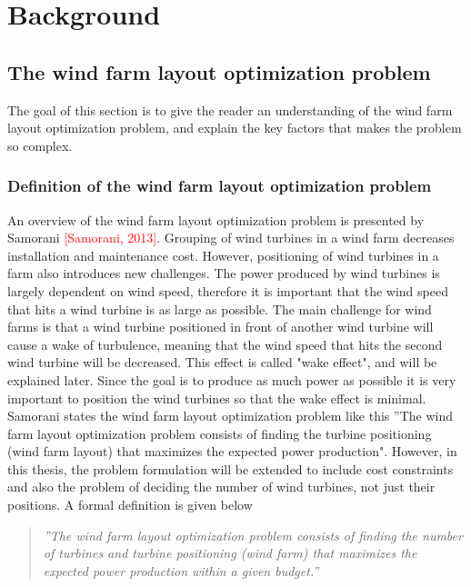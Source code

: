 \chapter{Background}


\section{The wind farm layout optimization problem}
The goal of this section is to give the reader an understanding of the wind farm layout optimization problem, and explain the key factors that makes the problem so complex. \textcolor{red}{\citep{Test}}


\subsection{Definition of the wind farm layout optimization problem}
An overview of the wind farm layout optimization problem is presented by Samorani \textcolor{red}{[Samorani, 2013]}. Grouping of wind turbines in a wind farm decreases installation and maintenance cost. However, positioning of wind turbines in a farm also introduces new challenges. The power produced by wind turbines is largely dependent on wind speed, therefore it is important that the wind speed that hits a wind turbine is as large as possible. The main challenge for wind farms is that a wind turbine positioned in front of another wind turbine will cause a wake of turbulence, meaning that the wind speed that hits the second wind turbine will be decreased. This effect is called "wake effect", and will be explained later. Since the goal is to produce as much power as possible it is very important to position the wind turbines so that the wake effect is minimal. Samorani states the wind farm layout optimization problem like this ''The wind farm layout optimization problem consists of finding the turbine positioning (wind farm layout) that maximizes the expected power production". However, in this thesis, the problem formulation will be extended to include cost constraints and also the problem of deciding the number of wind turbines, not just their positions. A formal definition is given below


\begin{quote}
\textit{''The wind farm layout optimization problem consists of finding the number of turbines and turbine positioning (wind farm) that maximizes the expected power production within a given budget.''}
\end{quote}


